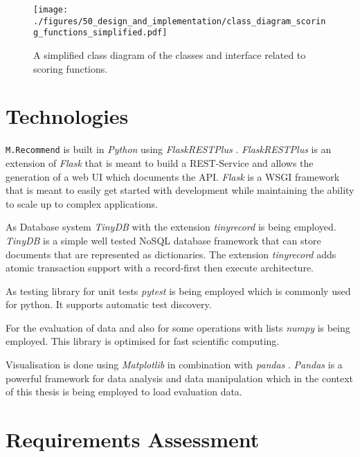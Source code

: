\begin{figure}
    \centering
    \texttt{[image: ./figures/50\_design\_and\_implementation/class\_diagram\_scoring\_functions\_simplified.pdf]}
    \caption[Class Diagram: Scoring Functions]{A simplified class diagram of the classes and interface related to scoring functions. }
    \label{fig:DesignImplementation:ClassDiagramScoringFunctions}
\end{figure}


\section{Technologies}
\label{sec:DesignImplementation:Technologies}

\texttt{M.Recommend} is built in \emph{Python} \cite{PythonOrg} using \emph{FlaskRESTPlus} \cite{FlaskRESTPlus13Documentation}. \emph{FlaskRESTPlus} is an extension of \emph{Flask} \cite{FlaskDocumentation} that is meant to build a REST-Service and allows the generation of a web UI which documents the API. \emph{Flask} is a WSGI \cite{WhatWSGI} framework that is meant to easily get started with development while maintaining the ability to scale up to complex applications.

As Database system \emph{TinyDB} \cite{TinyDB15Documentation} with the extension \emph{tinyrecord} \cite{junEugeneeeoTinyrecord2020} is being employed. \emph{TinyDB} is a simple well tested NoSQL database framework that can store documents that are represented as dictionaries. The extension \emph{tinyrecord} adds atomic transaction support with a record-first then execute architecture.

As testing library for unit tests \emph{pytest} \cite{PytestDocumentation} is being employed which is commonly used for python. It supports automatic test discovery.

For the evaluation of data and also for some operations with lists \emph{numpy} \cite{NumPy} is being employed. This library is optimised for fast scientific computing. 

Visualisation is done using \emph{Matplotlib} \cite{MatplotlibDocumentation} in combination with \emph{pandas} \cite{PandasPythonData}. \emph{Pandas} is a powerful framework for data analysis and data manipulation which in the context of this thesis is being employed to load evaluation data.


\section{Requirements Assessment}
\label{sec:DesignImplementation:RequirementsAssesment}


